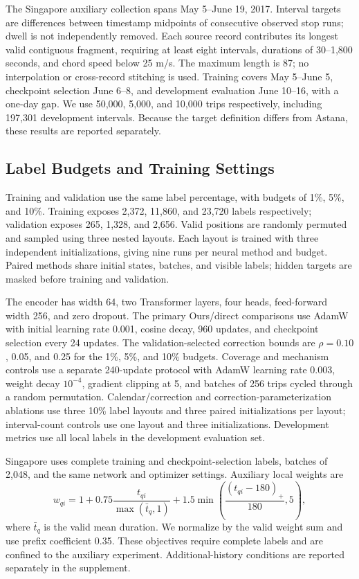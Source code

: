The Singapore auxiliary collection spans May 5--June 19, 2017. Interval targets are differences between timestamp midpoints of consecutive observed stop runs; dwell is not independently removed. Each source record contributes its longest valid contiguous fragment, requiring at least eight intervals, durations of 30--1,800 seconds, and chord speed below 25 m/s. The maximum length is 87; no interpolation or cross-record stitching is used. Training covers May 5--June 5, checkpoint selection June 6--8, and development evaluation June 10--16, with a one-day gap. We use 50,000, 5,000, and 10,000 trips respectively, including 197,301 development intervals. Because the target definition differs from Astana, these results are reported separately.

\subsection{Label Budgets and Training Settings}
Training and validation use the same label percentage, with budgets of 1\%, 5\%, and 10\%. Training exposes 2,372, 11,860, and 23,720 labels respectively; validation exposes 265, 1,328, and 2,656. Valid positions are randomly permuted and sampled using three nested layouts. Each layout is trained with three independent initializations, giving nine runs per neural method and budget. Paired methods share initial states, batches, and visible labels; hidden targets are masked before training and validation.

The encoder has width 64, two Transformer layers, four heads, feed-forward width 256, and zero dropout. The primary Ours/direct comparisons use AdamW with initial learning rate 0.001, cosine decay, 960 updates, and checkpoint selection every 24 updates. The validation-selected correction bounds are $\rho=0.10$, 0.05, and 0.25 for the 1\%, 5\%, and 10\% budgets. Coverage and mechanism controls use a separate 240-update protocol with AdamW learning rate 0.003, weight decay $10^{-4}$, gradient clipping at 5, and batches of 256 trips cycled through a random permutation. Calendar/correction and correction-parameterization ablations use three 10\% label layouts and three paired initializations per layout; interval-count controls use one layout and three initializations. Development metrics use all local labels in the development evaluation set.

Singapore uses complete training and checkpoint-selection labels, batches of 2,048, and the same network and optimizer settings. Auxiliary local weights are
\begin{equation}
w_{qi}=1+0.75\frac{t_{qi}}{\max(\bar t_q,1)}
+1.5\min\left(\frac{(t_{qi}-180)_+}{180},5\right),
\end{equation}
where $\bar t_q$ is the valid mean duration. We normalize by the valid weight sum and use prefix coefficient 0.35. These objectives require complete labels and are confined to the auxiliary experiment. Additional-history conditions are reported separately in the supplement.

